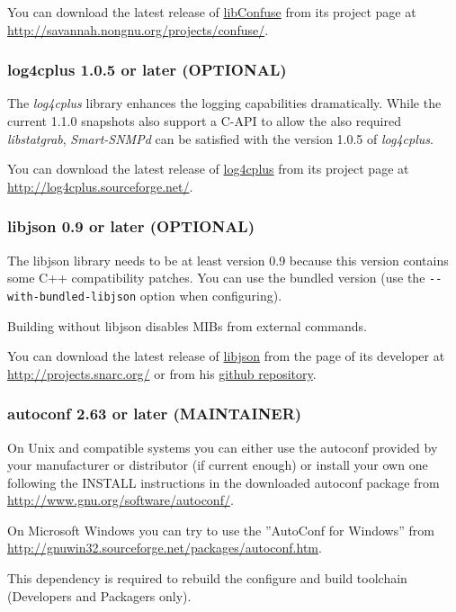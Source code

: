 You can download the latest release of
\href{http://www.nongnu.org/confuse/}{libConfuse} from its
project page at \url{http://savannah.nongnu.org/projects/confuse/}.

\subsubsection{log4cplus 1.0.5 or later (OPTIONAL)}

The \emph{log4cplus} library enhances the logging capabilities dramatically.
While the current 1.1.0 snapshots also support a C-API to allow the
also required \emph{libstatgrab}, \emph{Smart-SNMPd} can be satisfied
with the version 1.0.5 of \emph{log4cplus}.

You can download the latest release of
\href{http://log4cplus.sourceforge.net/}{log4cplus} from
its project page at \url{http://log4cplus.sourceforge.net/}.

\subsubsection{libjson 0.9 or later (OPTIONAL)}

The libjson library needs to be at least version 0.9 because this
version contains some C++ compatibility patches. You can use the
bundled version (use the \texttt{-\--with-bundled-libjson} option
when configuring).

Building without libjson disables MIBs from external commands.

You can download the latest release of
\href{http://projects.snarc.org/libjson/}{libjson} from the
page of its developer at \url{http://projects.snarc.org/} or from his
\href{http://github.com/vincenthz/libjson}{github repository}.

\subsubsection{autoconf 2.63 or later (MAINTAINER)}

On Unix and compatible systems you can either use the autoconf provided by
your manufacturer or distributor (if current enough) or install your own one
following the INSTALL instructions in the downloaded autoconf package from
\url{http://www.gnu.org/software/autoconf/}.

On Microsoft Windows you can try to use the ''AutoConf for Windows'' from
\url{http://gnuwin32.sourceforge.net/packages/autoconf.htm}.

This dependency is required to rebuild the configure and build toolchain
(Developers and Packagers only).

